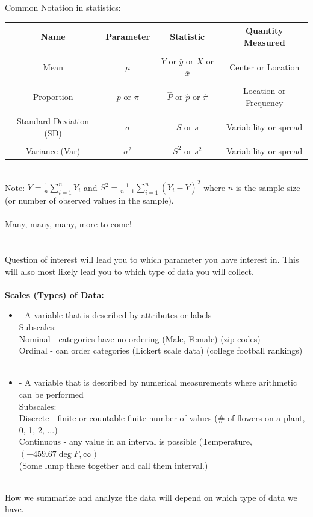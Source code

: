 \newpage

Common Notation in statistics:
\begin{center}
\begin{tabular}{c|ccc}
Name & Parameter & Statistic & Quantity Measured\\
\hline
&&&\\
Mean & $\mu$ & $\bar{Y}$ or $\bar{y}$ or $\bar{X}$ or $\bar{x}$ & Center or Location\\
&&&\\
Proportion & $p$ or $\pi$ & $\hat{P}$ or $\hat{p}$ or $\hat{\pi}$ & Location or Frequency\\
&&&\\
Standard Deviation (SD) & $\sigma$ & $S$ or $s$ & Variability or spread\\
&&&\\
Variance (Var) & $\sigma^2$ & $S^2$ or $s^2$ & Variability or spread\\
\end{tabular}
\end{center}
~\\
Note: $\bar{Y}=\frac{1}{n}\sum_{i=1}^{n}Y_i$ and $S^2=\frac{1}{n-1}\sum_{i=1}^{n}(Y_i-\bar{Y})^2$ where $n$ is the sample size (or number of observed values in the sample).\\~\\
Many, many, many, more to come! \\~\\~\\

Question of interest will lead you to which parameter you have interest in.  This will also most likely lead you to which type of data you will collect.\\~\\


\textbf{Scales (Types) of Data:}\\
\begin{itemize}
\item \underbar{~~~~~~~~~~~~~~~~~~~~~~~~~~~~~~~~~~~~~~~~~~~~~~~~~} - A variable that is described by attributes or labels\\
\indent Subscales: \\
Nominal - categories have no ordering (Male, Female) (zip codes)\\
Ordinal - can order categories (Lickert scale data) (college football rankings)\\~\\
\item \underbar{~~~~~~~~~~~~~~~~~~~~~~~~~~~~~~~} - A variable that is described by numerical measurements where arithmetic can be performed\\
\indent Subscales: \\
Discrete - finite or countable finite number of values (\# of flowers on a plant, 0, 1, 2, ...)\\
Continuous - any value in an interval is possible (Temperature, $(-459.67\deg F, \infty)$\\
(Some lump these together and call them interval.)
\end{itemize}
~\\
How we summarize and analyze the data will depend on which type of data we have.

